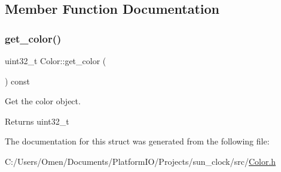 \subsection{Member Function Documentation}
\mbox{\label{struct_color_ad89142d0be21d2bf7ca2c2f343dfb21e}} 
\subsubsection{\texorpdfstring{get\+\_\+color()}{get\_color()}}
{\footnotesize\ttfamily uint32\+\_\+t Color\+::get\+\_\+color (\begin{DoxyParamCaption}{ }\end{DoxyParamCaption}) const\hspace{0.3cm}{\ttfamily [inline]}}



Get the color object. 

\begin{DoxyReturn}{Returns}
uint32\+\_\+t 
\end{DoxyReturn}


The documentation for this struct was generated from the following file\+:\begin{DoxyCompactItemize}
\item 
C\+:/\+Users/\+Omen/\+Documents/\+Platform\+I\+O/\+Projects/sun\+\_\+clock/src/\hyperlink{_color_8h}{Color.\+h}\end{DoxyCompactItemize}
